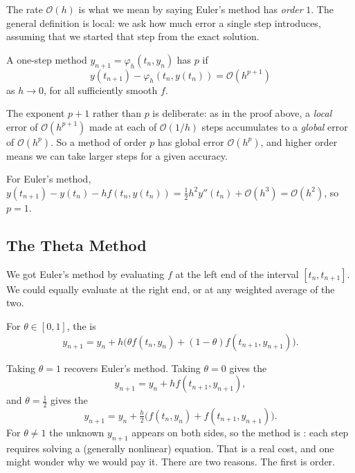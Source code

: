 \documentclass[a4paper]{scrartcl}
\begin{document}
The rate $\mathcal{O}(h)$ is what we mean by saying Euler's method has \emph{order} $1$. The general definition is local: we ask how much error a single step introduces, assuming that we started that step from the exact solution.

\begin{definition}[Order]
  A one-step method $y_{n+1} = \varphi_h(t_n, y_n)$ has  $p$ if
  $$
  y(t_{n+1}) - \varphi_h(t_n, y(t_n)) = \mathcal{O}(h^{p+1})
  $$
  as $h \to 0$, for all sufficiently smooth $f$.
\end{definition}

The exponent $p+1$ rather than $p$ is deliberate: as in the proof above, a \emph{local} error of $\mathcal{O}(h^{p+1})$ made at each of $\mathcal{O}(1/h)$ steps accumulates to a \emph{global} error of $\mathcal{O}(h^p)$. So a method of order $p$ has global error $\mathcal{O}(h^p)$, and higher order means we can take larger steps for a given accuracy.

\begin{example}
  For Euler's method, $y(t_{n+1}) - y(t_n) - hf(t_n,y(t_n)) = \tfrac12 h^2 y''(t_n) + \mathcal{O}(h^3) = \mathcal{O}(h^2)$, so $p = 1$.
\end{example}

\subsection{The Theta Method}

We got Euler's method by evaluating $f$ at the left end of the interval $[t_n, t_{n+1}]$. We could equally evaluate at the right end, or at any weighted average of the two.

\begin{definition}
  For $\theta \in [0,1]$, the  is
  $$
  y_{n+1} = y_n + h\Big(\theta f(t_n, y_n) + (1-\theta)f(t_{n+1}, y_{n+1})\Big).
  $$
\end{definition}

Taking $\theta = 1$ recovers Euler's method. Taking $\theta = 0$ gives the 
$$
y_{n+1} = y_n + hf(t_{n+1}, y_{n+1}),
$$
and $\theta = \tfrac12$ gives the 
$$
y_{n+1} = y_n + \tfrac{h}{2}\big(f(t_n,y_n) + f(t_{n+1},y_{n+1})\big).
$$
For $\theta \neq 1$ the unknown $y_{n+1}$ appears on both sides, so the method is : each step requires solving a (generally nonlinear) equation. That is a real cost, and one might wonder why we would pay it. There are two reasons. The first is order.
\end{document}
